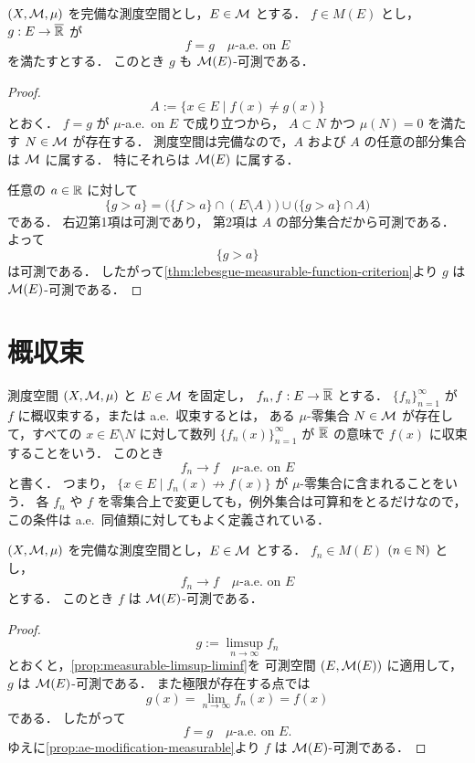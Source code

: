 \begin{proposition}[a.e.\ 修正による可測性]\label{prop:ae-modification-measurable}
$(X,\mathcal M,\mu)$ を完備な測度空間とし，$E\in\mathcal M$ とする．
$f\in M(E)$ とし，
$g:E\to\overline{\mathbb R}$ が
\[
f=g \quad \text{$\mu$-a.e.\ on } E
\]
を満たすとする．
このとき $g$ も $\mathcal M(E)$-可測である．
\end{proposition}
\begin{proof}
\[
A:=\{x\in E\mid f(x)\ne g(x)\}
\]
とおく．
$f=g$ が $\mu$-a.e.\ on $E$ で成り立つから，
$A\subset N$ かつ $\mu(N)=0$ を満たす $N\in\mathcal M$ が存在する．
測度空間は完備なので，$A$ および $A$ の任意の部分集合は $\mathcal M$ に属する．
特にそれらは $\mathcal M(E)$ に属する．

任意の $a\in\mathbb R$ に対して
\[
\{g>a\}
=
\bigl(\{f>a\}\cap(E\setminus A)\bigr)\cup\bigl(\{g>a\}\cap A\bigr)
\]
である．
右辺第1項は可測であり，
第2項は $A$ の部分集合だから可測である．
よって
\[
\{g>a\}
\]
は可測である．
したがって\cref{thm:lebesgue-measurable-function-criterion}より $g$ は $\mathcal M(E)$-可測である．
\end{proof}

\section{概収束} \label{sec:ae-convergence}

\begin{definition}[概収束]\label{def:ae-convergence}
測度空間 $(X,\mathcal M,\mu)$ と $E\in\mathcal M$ を固定し，
$f_n,f:E\to\overline{\mathbb R}$ とする．
$\{f_n\}_{n=1}^{\infty}$ が $f$ に概収束する，または a.e.\ 収束するとは，
ある $\mu$-零集合 $N\in\mathcal M$ が存在して，すべての
$x\in E\setminus N$ に対して数列 $\{f_n(x)\}_{n=1}^{\infty}$ が
$\overline{\mathbb R}$ の意味で $f(x)$ に収束することをいう．
このとき
\[
f_n\to f \quad \text{$\mu$-a.e.\ on } E
\]
と書く．
つまり，
$\{x\in E\mid f_n(x)\not\to f(x)\}$
が $\mu$-零集合に含まれることをいう．
各 $f_n$ や $f$ を零集合上で変更しても，例外集合は可算和をとるだけなので，
この条件は a.e.\ 同値類に対してもよく定義されている．
\end{definition}

\begin{corollary}[概収束の極限の可測性]\label{cor:ae-limit-measurable}
$(X,\mathcal M,\mu)$ を完備な測度空間とし，$E\in\mathcal M$ とする．
$f_n\in M(E)$ $(n\in\mathbb N)$ とし，
\[
f_n\to f\quad \text{$\mu$-a.e.\ on } E
\]
とする．
このとき $f$ は $\mathcal M(E)$-可測である．
\end{corollary}
\begin{proof}
\[
g:=\limsup_{n\to\infty}f_n
\]
とおくと，\cref{prop:measurable-limsup-liminf}を
可測空間 $(E,\mathcal M(E))$ に適用して，$g$ は $\mathcal M(E)$-可測である．
また極限が存在する点では
\[
g(x)=\lim_{n\to\infty}f_n(x)=f(x)
\]
である．
したがって
\[
f=g \quad \text{$\mu$-a.e.\ on } E.
\]
ゆえに\cref{prop:ae-modification-measurable}より $f$ は $\mathcal M(E)$-可測である．
\end{proof}

